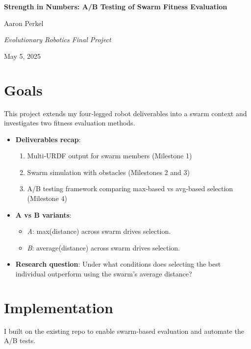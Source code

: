 \documentclass[12pt]{article}
\begin{document}
\begin{titlepage}
  \centering
  {\huge\bfseries Strength in Numbers: A/B Testing of Swarm Fitness Evaluation\par}
  \vspace{1.5cm}
  {\Large Aaron Perkel\par}
  {\emph{Evolutionary Robotics Final Project}\par}
  \vfill
  {\large May 5, 2025\par}
\end{titlepage}

\tableofcontents
\clearpage

\section{Goals}
This project extends my four‐legged robot deliverables into a swarm context and investigates two fitness evaluation methods.  

\begin{itemize}
  \item \textbf{Deliverables recap}:  
    \begin{enumerate}
      \item Multi‐URDF output for swarm members (Milestone 1)  
      \item Swarm simulation with obstacles (Milestones 2 and 3)  
      \item A/B testing framework comparing max‐based vs avg‐based selection (Milestone 4)  
    \end{enumerate}
  \item \textbf{A vs B variants}:  
    \begin{itemize}
      \item \emph{A}: max(distance) across swarm drives selection.  
      \item \emph{B}: average(distance) across swarm drives selection.  
    \end{itemize}
  \item \textbf{Research question}: Under what conditions does selecting the best individual outperform using the swarm’s average distance?  
\end{itemize}
\newpage

\section{Implementation}
I built on the existing repo to enable swarm‐based evaluation and automate the A/B tests.  
\end{document}

